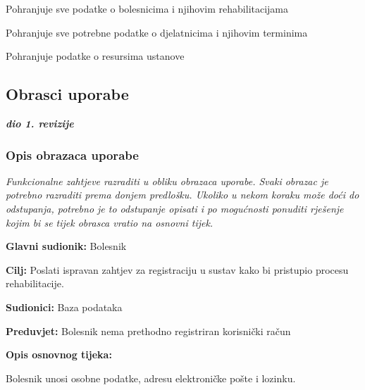 \begin{packed_enum}
\begin{packed_enum}
	\end{packed_enum}

	\item {}

	\begin{packed_enum}

		\item Pohranjuje sve podatke o bolesnicima i njihovim rehabilitacijama
		\item Pohranjuje sve potrebne podatke o djelatnicima i njihovim terminima
       		\item Pohranjuje podatke o resursima ustanove 

	\end{packed_enum}
\end{packed_enum}

\eject



\subsection{Obrasci uporabe}

\textbf{\textit{dio 1. revizije}}

\subsubsection{Opis obrazaca uporabe}
\textit{Funkcionalne zahtjeve razraditi u obliku obrazaca uporabe. Svaki obrazac je potrebno razraditi prema donjem predlošku. Ukoliko u nekom koraku može doći do odstupanja, potrebno je to odstupanje opisati i po mogućnosti ponuditi rješenje kojim bi se tijek obrasca vratio na osnovni tijek.}
\vspace{2em} %

	\item \textbf{Glavni sudionik:} Bolesnik
	\item \textbf{Cilj:} Poslati ispravan zahtjev za registraciju u sustav kako bi pristupio procesu rehabilitacije.
	\item \textbf{Sudionici:} Baza podataka
	\item \textbf{Preduvjet:} Bolesnik nema prethodno registriran korisnički račun
	\item \textbf{Opis osnovnog tijeka:}
	\begin{packed_enum}
		\item Bolesnik unosi osobne podatke, adresu elektroničke pošte i lozinku.
	\end{packed_enum}
\closeusecase


